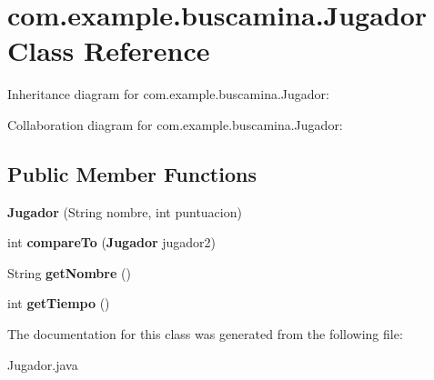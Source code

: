 \section{com.\-example.\-buscamina.\-Jugador Class Reference}
\label{classcom_1_1example_1_1buscamina_1_1_jugador}


Inheritance diagram for com.\-example.\-buscamina.\-Jugador\-:


Collaboration diagram for com.\-example.\-buscamina.\-Jugador\-:
\subsection*{Public Member Functions}
\begin{DoxyCompactItemize}
\item 
{\bfseries Jugador} (String nombre, int puntuacion)\label{classcom_1_1example_1_1buscamina_1_1_jugador_a7ac8e5c5b95b0a7bcb73edba98e171a4}

\item 
int {\bfseries compare\-To} ({\bf Jugador} jugador2)\label{classcom_1_1example_1_1buscamina_1_1_jugador_a6773dbcf116e1a32f6ec6ed85b46aabc}

\item 
String {\bfseries get\-Nombre} ()\label{classcom_1_1example_1_1buscamina_1_1_jugador_aaf89d2365ea7dec33a935731a6a48297}

\item 
int {\bfseries get\-Tiempo} ()\label{classcom_1_1example_1_1buscamina_1_1_jugador_a39dc2d47886a61097fd64e56220fa7c7}

\end{DoxyCompactItemize}


The documentation for this class was generated from the following file\-:\begin{DoxyCompactItemize}
\item 
Jugador.\-java\end{DoxyCompactItemize}
